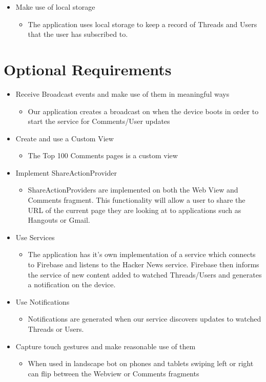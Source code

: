 \documentclass[11pt]{article}
\begin{document}
\begin{itemize}
	\item{Make use of local storage}
	\begin{itemize}
		\item{The application uses local storage to keep a record of Threads and Users that the user has subscribed to.}
	\end{itemize}
\end{itemize}

\section*{Optional Requirements}

\begin{itemize}
	\item{Receive Broadcast events and make use of them in meaningful ways}
	\begin{itemize}
		\item{Our application creates a broadcast on when the device boots in order to start the service for Comments/User updates}
	\end{itemize}
	\item{Create and use a Custom View}
	\begin{itemize}
		\item{The Top 100 Comments pages is a custom view}
	\end{itemize}
	\item{Implement ShareActionProvider}
	\begin{itemize}
		\item{ShareActionProviders are implemented on both the Web View and Comments fragment. This functionality will allow a user to share the URL of the current page they are looking at to applications such as Hangouts or Gmail.}
	\end{itemize}
	\item{Use Services}
	\begin{itemize}
		\item{The application has it's own implementation of a service which connects to Firebase and listens to the Hacker News service. Firebase then informs the service of new content added to watched Threads/Users and generates a notification on the device.}
	\end{itemize}
	\item{Use Notifications}
	\begin{itemize}
		\item{Notifications are generated when our service discovers updates to watched Threads or Users.}
	\end{itemize}
	\item{Capture touch gestures and make reasonable use of them}
	\begin{itemize}
		\item{When used in landscape bot on phones and tablets swiping left or right can flip between the Webview or Comments fragments}
	\end{itemize}
\end{itemize}
\pagebreak
\end{document}

